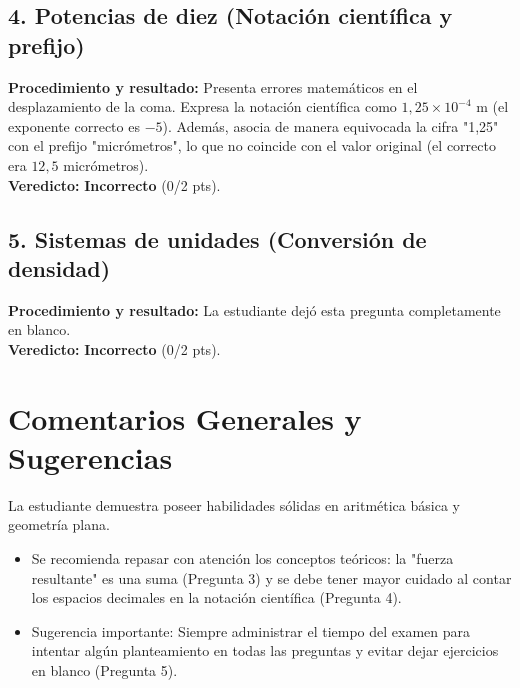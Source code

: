 \documentclass[12pt]{article}
\begin{document}
\subsection*{4. Potencias de diez (Notación científica y prefijo)}
\textbf{Procedimiento y resultado:} Presenta errores matemáticos en el desplazamiento de la coma. Expresa la notación científica como $1,25 \times 10^{-4}$ m (el exponente correcto es $-5$). Además, asocia de manera equivocada la cifra "1,25" con el prefijo "micrómetros", lo que no coincide con el valor original (el correcto era $12,5$ micrómetros). \\
\textbf{Veredicto:} \textbf{Incorrecto} (0/2 pts).

\subsection*{5. Sistemas de unidades (Conversión de densidad)}
\textbf{Procedimiento y resultado:} La estudiante dejó esta pregunta completamente en blanco. \\
\textbf{Veredicto:} \textbf{Incorrecto} (0/2 pts).

\vspace{0.5cm}
\section*{Comentarios Generales y Sugerencias}
La estudiante demuestra poseer habilidades sólidas en aritmética básica y geometría plana.
\begin{itemize}
    \item Se recomienda repasar con atención los conceptos teóricos: la "fuerza resultante" es una suma (Pregunta 3) y se debe tener mayor cuidado al contar los espacios decimales en la notación científica (Pregunta 4).
    \item Sugerencia importante: Siempre administrar el tiempo del examen para intentar algún planteamiento en todas las preguntas y evitar dejar ejercicios en blanco (Pregunta 5).
\end{itemize}
\end{document}

